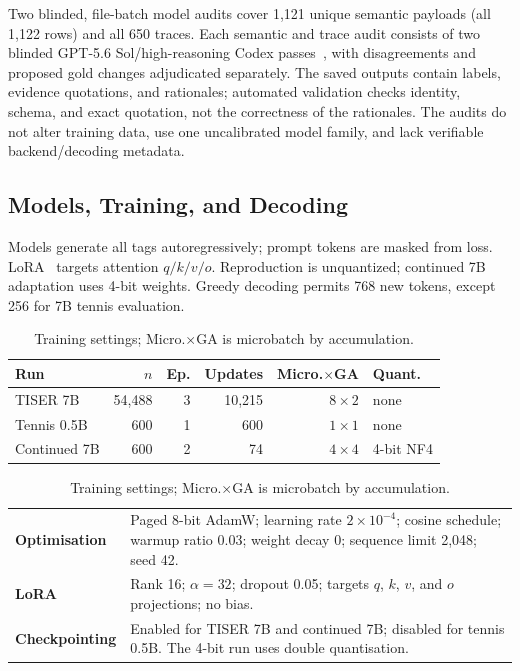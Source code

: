 \documentclass[conference]{IEEEtran}
\begin{document}
Two blinded, file-batch model audits cover 1,121 unique semantic payloads (all 1,122 rows) and all 650 traces. Each semantic and trace audit consists of two blinded GPT-5.6 Sol/high-reasoning Codex passes~\cite{openai2026codexapp}, with disagreements and proposed gold changes adjudicated separately. The saved outputs contain labels, evidence quotations, and rationales; automated validation checks identity, schema, and exact quotation, not the correctness of the rationales. The audits do not alter training data, use one uncalibrated model family, and lack verifiable backend/decoding metadata.

\subsection{Models, Training, and Decoding}

Models generate all tags autoregressively; prompt tokens are masked from loss. LoRA~\cite{hu2022lora} targets attention $q/k/v/o$. Reproduction is unquantized; continued 7B adaptation uses 4-bit weights. Greedy decoding permits 768 new tokens, except 256 for 7B tennis evaluation.

\begin{table}[t]
\centering
\caption{Training settings; Micro.$\times$GA is microbatch by accumulation.}
\label{tab:settings}
\setlength{\tabcolsep}{2.3pt}
{\footnotesize
\begin{tabular}{lrrrrl}
\toprule
\textbf{Run} & \textbf{$n$} & \textbf{Ep.} & \textbf{Updates} & \textbf{Micro.$\times$GA} & \textbf{Quant.} \\
\midrule
TISER 7B & 54{,}488 & 3 & 10{,}215 & $8{\times}2$ & none \\
Tennis 0.5B & 600 & 1 & 600 & $1{\times}1$ & none \\
Continued 7B & 600 & 2 & 74 & $4{\times}4$ & 4-bit NF4 \\
\bottomrule
\end{tabular}

\vspace{0.4em}
\begin{tabular}{@{}lp{}@{}}
\textbf{Optimisation} & Paged 8-bit AdamW; learning rate $2{\times}10^{-4}$; cosine schedule; warmup ratio 0.03; weight decay 0; sequence limit 2,048; seed 42. \\
\textbf{LoRA} & Rank 16; $\alpha=32$; dropout 0.05; targets $q$, $k$, $v$, and $o$ projections; no bias. \\
\textbf{Checkpointing} & Enabled for TISER 7B and continued 7B; disabled for tennis 0.5B. The 4-bit run uses double quantisation. \\
\end{tabular}
}
\end{table}
\end{document}
